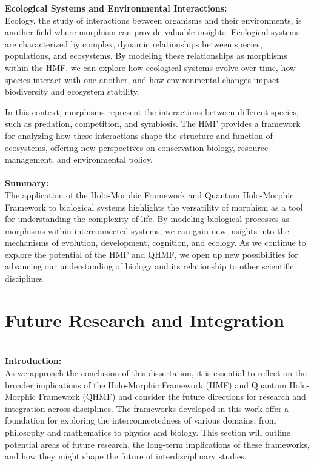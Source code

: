 \documentclass{article}
\begin{document}
\textbf{Ecological Systems and Environmental Interactions:}
\\

Ecology, the study of interactions between organisms and their environments, is another field where morphism can provide valuable insights. Ecological systems are characterized by complex, dynamic relationships between species, populations, and ecosystems. By modeling these relationships as morphisms within the HMF, we can explore how ecological systems evolve over time, how species interact with one another, and how environmental changes impact biodiversity and ecosystem stability.

In this context, morphisms represent the interactions between different species, such as predation, competition, and symbiosis. The HMF provides a framework for analyzing how these interactions shape the structure and function of ecosystems, offering new perspectives on conservation biology, resource management, and environmental policy.
\\
\\

\textbf{Summary:}
\\

The application of the Holo-Morphic Framework and Quantum Holo-Morphic Framework to biological systems highlights the versatility of morphism as a tool for understanding the complexity of life. By modeling biological processes as morphisms within interconnected systems, we can gain new insights into the mechanisms of evolution, development, cognition, and ecology. As we continue to explore the potential of the HMF and QHMF, we open up new possibilities for advancing our understanding of biology and its relationship to other scientific disciplines.
\\

\section*{Future Research and Integration}
\\

\textbf{Introduction:}
\\

As we approach the conclusion of this dissertation, it is essential to reflect on the broader implications of the Holo-Morphic Framework (HMF) and Quantum Holo-Morphic Framework (QHMF) and consider the future directions for research and integration across disciplines. The frameworks developed in this work offer a foundation for exploring the interconnectedness of various domains, from philosophy and mathematics to physics and biology. This section will outline potential areas of future research, the long-term implications of these frameworks, and how they might shape the future of interdisciplinary studies.
\\
\\
\end{document}
